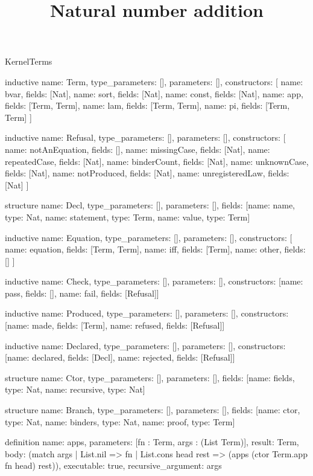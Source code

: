 \begin{lexlean}{KernelTerms}
\title{Natural number addition}
\begin{semanticmodule}
inductive{
  name: Term,
  type_parameters: [],
  parameters: [],
  constructors: [
    {name: bvar, fields: [Nat]},
    {name: sort, fields: [Nat]},
    {name: const, fields: [Nat]},
    {name: app, fields: [Term, Term]},
    {name: lam, fields: [Term, Term]},
    {name: pi, fields: [Term, Term]}
  ]
}

inductive{
  name: Refusal,
  type_parameters: [],
  parameters: [],
  constructors: [
    {name: notAnEquation, fields: []},
    {name: missingCase, fields: [Nat]},
    {name: repeatedCase, fields: [Nat]},
    {name: binderCount, fields: [Nat]},
    {name: unknownCase, fields: [Nat]},
    {name: notProduced, fields: [Nat]},
    {name: unregisteredLaw, fields: [Nat]}
  ]
}

structure{
  name: Decl,
  type_parameters: [],
  parameters: [],
  fields: [{name: name, type: Nat}, {name: statement, type: Term}, {name: value, type: Term}]
}

inductive{
  name: Equation,
  type_parameters: [],
  parameters: [],
  constructors: [
    {name: equation, fields: [Term, Term]},
    {name: iff, fields: [Term]},
    {name: other, fields: []}
  ]
}

inductive{
  name: Check,
  type_parameters: [],
  parameters: [],
  constructors: [{name: pass, fields: []}, {name: fail, fields: [Refusal]}]
}

inductive{
  name: Produced,
  type_parameters: [],
  parameters: [],
  constructors: [{name: made, fields: [Term]}, {name: refused, fields: [Refusal]}]
}

inductive{
  name: Declared,
  type_parameters: [],
  parameters: [],
  constructors: [{name: declared, fields: [Decl]}, {name: rejected, fields: [Refusal]}]
}

structure{
  name: Ctor,
  type_parameters: [],
  parameters: [],
  fields: [{name: fields, type: Nat}, {name: recursive, type: Nat}]
}

structure{
  name: Branch,
  type_parameters: [],
  parameters: [],
  fields: [{name: ctor, type: Nat}, {name: binders, type: Nat}, {name: proof, type: Term}]
}

definition{
  name: apps,
  parameters: [fn : Term, args : (List Term)],
  result: Term,
  body: (match args | List.nil => fn | List.cons head rest => (apps (ctor Term.app fn head) rest)),
  executable: true,
  recursive_argument: args
}


\end{semanticmodule}
\end{lexlean}
